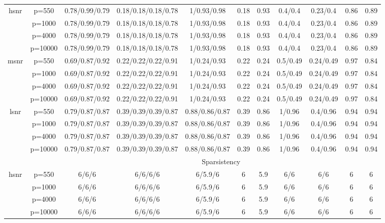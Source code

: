 \begin{table}[ht]
{\begin{tabular}{|c|c|ccccccccc|}
\midrule\multirow{4}[2]{*}{hsnr} & p=550 & 0.78/0.99/0.79 & 0.18/0.18/0.18/0.78 & 1/0.93/0.98 & 0.18 & 0.93 & 0.4/0.4 & 0.23/0.4 & 0.86 & 0.89 \\ 
   & p=1000 & 0.78/0.99/0.79 & 0.18/0.18/0.18/0.78 & 1/0.93/0.98 & 0.18 & 0.93 & 0.4/0.4 & 0.23/0.4 & 0.86 & 0.89 \\ 
   & p=4000 & 0.78/0.99/0.79 & 0.18/0.18/0.18/0.78 & 1/0.93/0.98 & 0.18 & 0.93 & 0.4/0.4 & 0.23/0.4 & 0.86 & 0.89 \\ 
   & p=10000 & 0.78/0.99/0.79 & 0.18/0.18/0.18/0.78 & 1/0.93/0.98 & 0.18 & 0.93 & 0.4/0.4 & 0.23/0.4 & 0.86 & 0.89 \\ 
  \midrule\multirow{4}[2]{*}{msnr} & p=550 & 0.69/0.87/0.92 & 0.22/0.22/0.22/0.91 & 1/0.24/0.93 & 0.22 & 0.24 & 0.5/0.49 & 0.24/0.49 & 0.97 & 0.84 \\ 
   & p=1000 & 0.69/0.87/0.92 & 0.22/0.22/0.22/0.91 & 1/0.24/0.93 & 0.22 & 0.24 & 0.5/0.49 & 0.24/0.49 & 0.97 & 0.84 \\ 
   & p=4000 & 0.69/0.87/0.92 & 0.22/0.22/0.22/0.91 & 1/0.24/0.93 & 0.22 & 0.24 & 0.5/0.49 & 0.24/0.49 & 0.97 & 0.84 \\ 
   & p=10000 & 0.69/0.87/0.92 & 0.22/0.22/0.22/0.91 & 1/0.24/0.93 & 0.22 & 0.24 & 0.5/0.49 & 0.24/0.49 & 0.97 & 0.84 \\ 
  \midrule\multirow{4}[2]{*}{lsnr} & p=550 & 0.79/0.87/0.87 & 0.39/0.39/0.39/0.87 & 0.88/0.86/0.87 & 0.39 & 0.86 & 1/0.96 & 0.4/0.96 & 0.94 & 0.94 \\ 
   & p=1000 & 0.79/0.87/0.87 & 0.39/0.39/0.39/0.87 & 0.88/0.86/0.87 & 0.39 & 0.86 & 1/0.96 & 0.4/0.96 & 0.94 & 0.94 \\ 
   & p=4000 & 0.79/0.87/0.87 & 0.39/0.39/0.39/0.87 & 0.88/0.86/0.87 & 0.39 & 0.86 & 1/0.96 & 0.4/0.96 & 0.94 & 0.94 \\ 
   & p=10000 & 0.79/0.87/0.87 & 0.39/0.39/0.39/0.87 & 0.88/0.86/0.87 & 0.39 & 0.86 & 1/0.96 & 0.4/0.96 & 0.94 & 0.94 \\ 
   \midrule 
 \multicolumn{1}{|c}{} &       & \multicolumn{9}{c|}{Sparsistency} \\
\midrule\multirow{4}[2]{*}{hsnr} & p=550 & 6/6/6 & 6/6/6/6 & 6/5.9/6 & 6 & 5.9 & 6/6 & 6/6 & 6 & 6 \\ 
   & p=1000 & 6/6/6 & 6/6/6/6 & 6/5.9/6 & 6 & 5.9 & 6/6 & 6/6 & 6 & 6 \\ 
   & p=4000 & 6/6/6 & 6/6/6/6 & 6/5.9/6 & 6 & 5.9 & 6/6 & 6/6 & 6 & 6 \\ 
   & p=10000 & 6/6/6 & 6/6/6/6 & 6/5.9/6 & 6 & 5.9 & 6/6 & 6/6 & 6 & 6 \\ 

\end{tabular}}
\end{table}
